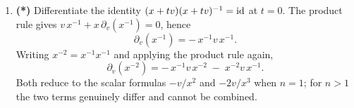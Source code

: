 \begin{exercisesolution}
\begin{enumerate}[label=\textbf{(\alph*)}]
    the last using cyclicity of the trace. Note that $\partial_v(x^2) \neq 2xv$: matrices do not
    commute, and the familiar one-variable answer is precisely what fails.
  \item \textbf{(*)} Differentiate the identity $(x+tv)(x+tv)^{-1} = \operatorname{id}$ at $t=0$. The product
    rule gives $v\,x^{-1} + x\,\partial_v(x^{-1}) = 0$, hence
    \[\partial_v(x^{-1}) = -\,x^{-1}v\,x^{-1}.\]
    Writing $x^{-2} = x^{-1}x^{-1}$ and applying the product rule again,
    \[\partial_v(x^{-2}) = -\,x^{-1}v\,x^{-2} \;-\; x^{-2}v\,x^{-1}.\]
    Both reduce to the scalar formulas $-v/x^2$ and $-2v/x^3$ when $n=1$; for $n>1$ the two terms
    genuinely differ and cannot be combined.
\end{enumerate}
\end{exercisesolution}

